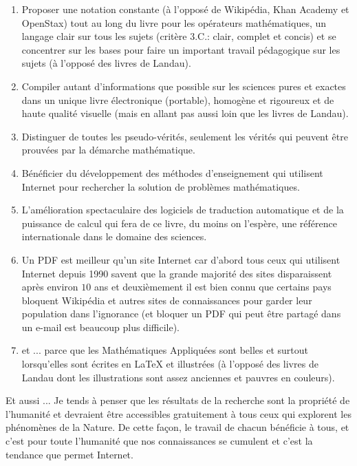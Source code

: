 \begin{enumerate}
		\item Proposer une notation constante (à l'oppos\'e de Wikip\'edia, Khan Academy et OpenStax) tout au long du livre pour les op\'erateurs math\'ematiques, un langage clair sur tous les sujets (critère 3.C.: clair, complet et concis) et se concentrer sur les bases pour faire un important travail p\'edagogique sur les sujets (à l'oppos\'e des livres de Landau).

		\item Compiler autant d'informations que possible sur les sciences pures et exactes dans un unique livre \'electronique (portable), homogène et rigoureux et de haute qualit\'e visuelle (mais en allant pas aussi loin que les livres de Landau).

		\item Distinguer de toutes les pseudo-v\'erit\'es, seulement les v\'erit\'es qui peuvent être prouv\'ees par la d\'emarche math\'ematique.

		\item B\'en\'eficier du d\'eveloppement des m\'ethodes d'enseignement qui utilisent Internet pour rechercher la solution de problèmes math\'ematiques.

		\item L'am\'elioration spectaculaire des logiciels de traduction automatique et de la puissance de calcul qui fera de ce livre, du moins on l'espère, une r\'ef\'erence internationale dans le domaine des sciences.
		
		\item Un PDF est meilleur qu'un site Internet car d'abord tous ceux qui utilisent Internet depuis 1990 savent que la grande majorit\'e des sites disparaissent après environ $10$ ans et deuxièmement il est bien connu que certains pays bloquent Wikip\'edia et autres sites de connaissances pour garder leur population dans l'ignorance (et bloquer un PDF qui peut être partag\'e dans un e-mail est beaucoup plus difficile).
		
		\item et ... parce que les Math\'ematiques Appliqu\'ees sont belles et surtout lorsqu'elles sont \'ecrites en \LaTeX{} et illustr\'ees (à l'oppos\'e des livres de Landau dont les illustrations sont assez anciennes et pauvres en couleurs).
\end{enumerate}

	Et aussi ... Je tends à penser que les r\'esultats de la recherche sont la propri\'et\'e de l'humanit\'e et devraient être accessibles gratuitement à tous ceux qui explorent les ph\'enomènes de la Nature. De cette façon, le travail de chacun b\'en\'eficie à tous, et c'est pour toute l'humanit\'e que nos connaissances se cumulent et c'est la tendance que permet Internet.

